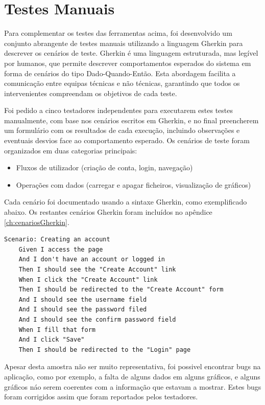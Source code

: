 \section{Testes Manuais}

Para complementar os testes das ferramentas acima, foi desenvolvido um conjunto abrangente de testes manuais utilizando a linguagem Gherkin para descrever os cenários de teste. Gherkin é uma linguagem estruturada, mas legível por humanos, que permite descrever comportamentos esperados do sistema em forma de cenários do tipo Dado-Quando-Então. Esta abordagem facilita a comunicação entre equipas técnicas e não técnicas, garantindo que todos os intervenientes compreendam os objetivos de cada teste.

Foi pedido a cinco testadores independentes para executarem estes testes manualmente, com base nos cenários escritos em Gherkin, e no final preencherem um formulário com os resultados de cada execução, incluindo observações e eventuais desvios face ao comportamento esperado. Os cenários de teste foram organizados em duas categorias principais:

\begin{itemize}
    \item Fluxos de utilizador (criação de conta, login, navegação)
    \item Operações com dados (carregar e apagar ficheiros, visualização de gráficos)
\end{itemize}

Cada cenário foi documentado usando a sintaxe Gherkin, como exemplificado abaixo. Os restantes cenários Gherkin foram incluídos no apêndice \ref{ch:cenariosGherkin}.

\begin{lstlisting}[language=Gherkin, caption={Excerto do código Gherkin do cenário de teste para a criação de uma conta}]
Scenario: Creating an account
	Given I access the page 
	And I don't have an account or logged in
	Then I should see the "Create Account" link
	When I click the "Create Account" link
	Then I should be redirected to the "Create Account" form
	And I should see the username field
	And I should see the password filed
	And I should see the confirm password field
	When I fill that form
	And I click "Save"
	Then I should be redirected to the "Login" page
\end{lstlisting}

Apesar desta amostra não ser muito representativa, foi possivel encontrar bugs na aplicação, como por exemplo, a falta de alguns dados em alguns gráficos, e alguns gráficos náo serem coerentes com a informação que estavam a mostrar. Estes bugs foram corrigidos assim que foram reportados pelos testadores.

